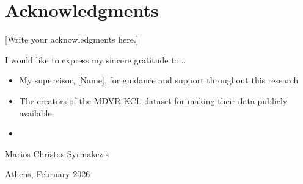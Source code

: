 
\chapter*{Acknowledgments}

[Write your acknowledgments here.]

I would like to express my sincere gratitude to...

\begin{itemize}
    \item My supervisor, [Name], for guidance and support throughout this research
    \item The creators of the MDVR-KCL dataset for making their data publicly available
    \item [Additional acknowledgments]
\end{itemize}

\vspace{2cm}

\hfill Marios Christos Syrmakezis

\hfill Athens, February 2026

\blankpage
